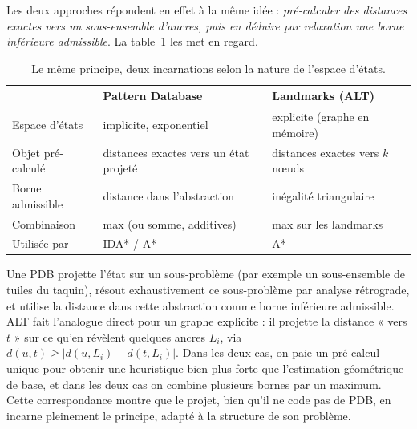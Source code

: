 \medskip

Les deux approches répondent en effet à la même idée : \emph{pré-calculer des
distances exactes vers un sous-ensemble d'ancres, puis en déduire par relaxation
une borne inférieure admissible}. La table~\ref{tab:pdb-alt} les met en regard.

\begin{table}[htbp]
  \centering
  \small
  \begin{tabular}{@{}lll@{}}
    \toprule
    & Pattern Database & Landmarks (ALT) \\
    \midrule
    Espace d'états      & implicite, exponentiel      & explicite (graphe en mémoire) \\
    Objet pré-calculé   & distances exactes vers un état projeté & distances exactes vers $k$ nœuds \\
    Borne admissible    & distance dans l'abstraction & inégalité triangulaire \\
    Combinaison         & max (ou somme, additives)   & max sur les landmarks \\
    Utilisée par        & IDA* / A*                   & A* \\
    \bottomrule
  \end{tabular}
  \caption{Le même principe, deux incarnations selon la nature de l'espace d'états.}
  \label{tab:pdb-alt}
\end{table}

Une PDB projette l'état sur un sous-problème (par exemple un sous-ensemble de
tuiles du taquin), résout exhaustivement ce sous-problème par analyse rétrograde,
et utilise la distance dans cette abstraction comme borne inférieure admissible.
ALT fait l'analogue direct pour un graphe explicite : il projette la distance
« vers $t$ » sur ce qu'en révèlent quelques ancres $L_i$, via
$d(u,t) \ge |d(u,L_i) - d(t,L_i)|$. Dans les deux cas, on paie un pré-calcul
unique pour obtenir une heuristique bien plus forte que l'estimation géométrique
de base, et dans les deux cas on combine plusieurs bornes par un maximum. Cette
correspondance montre que le projet, bien qu'il ne code pas de PDB, en incarne
pleinement le principe, adapté à la structure de son problème.
